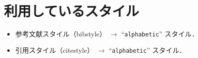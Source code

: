 \documentclass[10pt]{jlreq}
\begin{document}
\section{利用しているスタイル}

\begin{itemize}
 \item 参考文献スタイル（bibstyle） $\rightarrow$ ``\texttt{alphabetic}'' スタイル．
 \item 引用スタイル（citestyle） $\rightarrow$ ``\texttt{alphabetic}'' スタイル．
\end{itemize}


\end{document}
